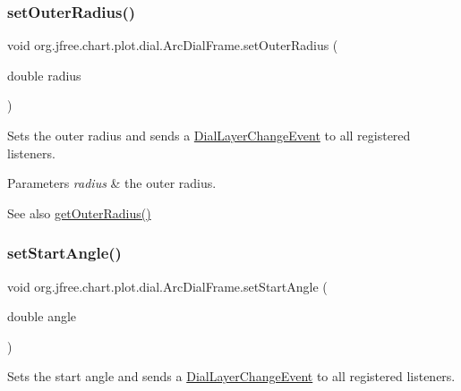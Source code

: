 \subsubsection{\texorpdfstring{set\+Outer\+Radius()}{setOuterRadius()}}
{\footnotesize\ttfamily void org.\+jfree.\+chart.\+plot.\+dial.\+Arc\+Dial\+Frame.\+set\+Outer\+Radius (\begin{DoxyParamCaption}\item[{double}]{radius }\end{DoxyParamCaption})}

Sets the outer radius and sends a \mbox{\hyperlink{classorg_1_1jfree_1_1chart_1_1plot_1_1dial_1_1_dial_layer_change_event}{Dial\+Layer\+Change\+Event}} to all registered listeners.


\begin{DoxyParams}{Parameters}
{\em radius} & the outer radius.\\
\hline
\end{DoxyParams}
\begin{DoxySeeAlso}{See also}
\mbox{\hyperlink{classorg_1_1jfree_1_1chart_1_1plot_1_1dial_1_1_arc_dial_frame_a7f3b8ed6a85161689a6bad89a5c29b0a}{get\+Outer\+Radius()}} 
\end{DoxySeeAlso}
\mbox{\label{classorg_1_1jfree_1_1chart_1_1plot_1_1dial_1_1_arc_dial_frame_a0d44deb5dbd1be60ddeca18f1f82b0de}} 
\subsubsection{\texorpdfstring{set\+Start\+Angle()}{setStartAngle()}}
{\footnotesize\ttfamily void org.\+jfree.\+chart.\+plot.\+dial.\+Arc\+Dial\+Frame.\+set\+Start\+Angle (\begin{DoxyParamCaption}\item[{double}]{angle }\end{DoxyParamCaption})}

Sets the start angle and sends a \mbox{\hyperlink{classorg_1_1jfree_1_1chart_1_1plot_1_1dial_1_1_dial_layer_change_event}{Dial\+Layer\+Change\+Event}} to all registered listeners.


